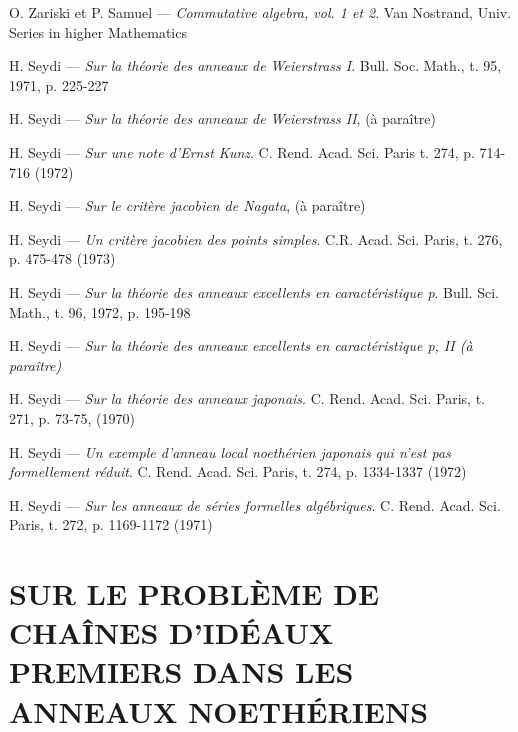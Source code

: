 \begin{thebibliography}{99}
  {\sc O. Zariski et P. Samuel} ---
  {\it Commutative algebra, vol. 1 et 2}. Van Nostrand, Univ. Series in higher Mathematics

  {\sc H. Seydi} ---
  {\it Sur la théorie des anneaux de Weierstrass I}. Bull. Soc. Math., t. 95, 1971, p. 225-227

  {\sc H. Seydi} ---
  {\it Sur la théorie des anneaux de Weierstrass II}, (à paraître)

  {\sc H. Seydi} ---
  {\it Sur une note d’Ernst Kunz}. C. Rend. Acad. Sci. Paris t. 274, p. 714-716 (1972)

  {\sc H. Seydi} ---
  {\it Sur le critère jacobien de Nagata}, (à paraître)

  {\sc H. Seydi} ---
  {\it Un critère jacobien des points simples}. C.R. Acad. Sci. Paris, t. 276, p. 475-478 (1973)

  {\sc H. Seydi} ---
  {\it Sur la théorie des anneaux excellents en caractéristique p}. Bull. Sci. Math., t. 96, 1972, p. 195-198

  {\sc H. Seydi} ---
  {\it Sur la théorie des anneaux excellents en caractéristique p, II (à paraître)}

  {\sc H. Seydi} ---
  {\it Sur la théorie des anneaux japonais}. C. Rend. Acad. Sci. Paris, t. 271, p. 73-75, (1970)

  {\sc H. Seydi} ---
  {\it Un exemple d’anneau local noethérien japonais qui n’est pas formellement réduit}. C. Rend. Acad. Sci. Paris, t. 274, p. 1334-1337 (1972)

  {\sc H. Seydi} ---
  {\it Sur les anneaux de séries formelles algébriques}. C. Rend. Acad. Sci. Paris, t. 272, p. 1169-1172 (1971)

\end{thebibliography}

\chapter*{SUR LE PROBLÈME DE CHAÎNES D’IDÉAUX PREMIERS DANS LES ANNEAUX NOETHÉRIENS}\thispagestyle{empty}
\label{sec:b}
\section*{}


